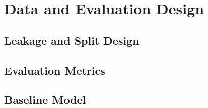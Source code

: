 \section{Data and Evaluation Design}

\subsection{Leakage and Split Design}

\subsection{Evaluation Metrics}

\subsection{Baseline Model}
